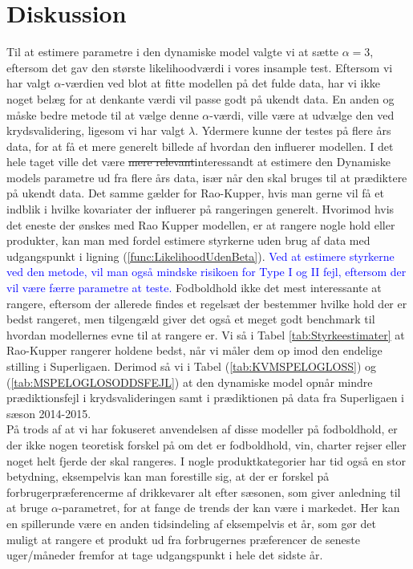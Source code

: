 \documentclass[11pt,a4paper]{article}
\begin{document}
\clearpage
\section{Diskussion}
Til at estimere parametre i den dynamiske model valgte vi at sætte $\alpha=3$, eftersom det gav den største likelihoodværdi i vores insample test. Eftersom vi har valgt $\alpha$-værdien ved blot at fitte modellen på det fulde data, har vi ikke noget belæg for at denkante værdi vil passe godt på ukendt data. En anden og måske bedre metode til at vælge denne $\alpha$-værdi, ville være at udvælge den ved krydsvalidering, ligesom vi har valgt $\lambda$. Ydermere kunne der testes på flere års data, for at få et mere generelt billede af hvordan den influerer modellen. I det hele taget ville det være \sout{mere relevant}interessandt at estimere den Dynamiske models parametre ud fra flere års data, især når den skal bruges til at prædiktere på ukendt data. Det samme gælder for Rao-Kupper, hvis man gerne vil få et indblik i hvilke kovariater der influerer på rangeringen generelt. Hvorimod hvis det eneste der ønskes med Rao Kupper modellen, er at rangere nogle hold eller produkter, kan man med fordel estimere styrkerne uden brug af data med udgangspunkt i ligning (\ref{func:LikelihoodUdenBeta}). \textcolor{blue}{Ved at estimere styrkerne ved den metode, vil man også mindske risikoen for Type I og II fejl, eftersom der vil være færre parametre at teste.} Fodboldhold ikke det mest interessante at rangere, eftersom der allerede findes et regelsæt der bestemmer hvilke hold der er bedst rangeret, men tilgengæld giver det også et meget godt benchmark til hvordan modellernes evne til at rangere er. Vi så i Tabel \ref{tab:Styrkeestimater} at Rao-Kupper rangerer holdene bedst, når vi måler dem op imod den endelige stilling i Superligaen. Derimod så vi i Tabel (\ref{tab:KVMSPELOGLOSS}) og (\ref{tab:MSPELOGLOSODDSFEJL}) at den dynamiske model opnår mindre prædiktionsfejl i krydsvalideringen samt i prædiktionen på data fra Superligaen i sæson 2014-2015.\\
På trods af at vi har fokuseret anvendelsen af disse modeller på fodboldhold, er der ikke nogen teoretisk forskel på om det er fodboldhold, vin, charter rejser eller noget helt fjerde der skal rangeres. I nogle produktkategorier har tid også en stor betydning, eksempelvis kan man forestille sig, at der er forskel på forbrugerpræferencerme af drikkevarer alt efter sæsonen, som giver anledning til at bruge $\alpha$-parametret, for at fange de trends der kan være i markedet. Her kan en spillerunde være en anden tidsindeling af eksempelvis et år, som gør det muligt at rangere et produkt ud fra forbrugernes præferencer de seneste uger/måneder fremfor at tage udgangspunkt i hele det sidste år. \\
\end{document}

